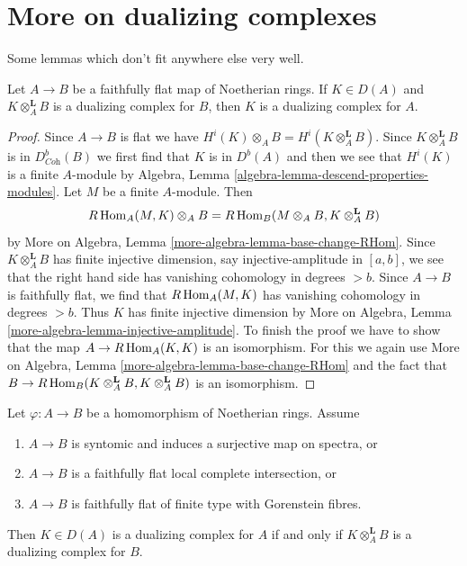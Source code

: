 \section{More on dualizing complexes}
\label{section-more-dualizing}

\noindent
Some lemmas which don't fit anywhere else very well.

\begin{lemma}
\label{lemma-descent}
Let $A \to B$ be a faithfully flat map of Noetherian rings.
If $K \in D(A)$ and $K \otimes_A^\mathbf{L} B$
is a dualizing complex for $B$, then $K$ is a dualizing complex
for $A$.
\end{lemma}

\begin{proof}
Since $A \to B$ is flat we have
$H^i(K) \otimes_A B = H^i(K \otimes_A^\mathbf{L} B)$.
Since $K \otimes_A^\mathbf{L} B$ is in $D^b_{\textit{Coh}}(B)$
we first find that $K$ is in $D^b(A)$ and then we see that
$H^i(K)$ is a finite $A$-module by
Algebra, Lemma \ref{algebra-lemma-descend-properties-modules}.
Let $M$ be a finite $A$-module. Then
$$
R\mathop{\mathrm{Hom}}\nolimits_A(M, K) \otimes_A B = R\mathop{\mathrm{Hom}}\nolimits_B(M \otimes_A B, K \otimes_A^\mathbf{L} B)
$$
by More on Algebra, Lemma \ref{more-algebra-lemma-base-change-RHom}.
Since $K \otimes_A^\mathbf{L} B$ has finite injective dimension,
say injective-amplitude in $[a, b]$, we see that the right hand side
has vanishing cohomology in degrees $> b$.
Since $A \to B$ is faithfully flat, we find
that $R\mathop{\mathrm{Hom}}\nolimits_A(M, K)$ has vanishing cohomology in degrees $> b$.
Thus $K$ has finite injective dimension by
More on Algebra, Lemma \ref{more-algebra-lemma-injective-amplitude}.
To finish the proof we have to show that the map
$A \to R\mathop{\mathrm{Hom}}\nolimits_A(K, K)$ is an isomorphism.
For this we again use
More on Algebra, Lemma \ref{more-algebra-lemma-base-change-RHom}
and the fact that
$B \to R\mathop{\mathrm{Hom}}\nolimits_B(K \otimes_A^\mathbf{L} B, K \otimes_A^\mathbf{L} B)$
is an isomorphism.
\end{proof}

\begin{lemma}
\label{lemma-descent-ascent}
Let $\varphi : A \to B$ be a homomorphism of Noetherian rings. Assume
\begin{enumerate}
\item $A \to B$ is syntomic and induces a surjective map on spectra, or
\item $A \to B$ is a faithfully flat local complete intersection, or
\item $A \to B$ is faithfully flat of finite type with Gorenstein fibres.
\end{enumerate}
Then $K \in D(A)$ is a dualizing complex for $A$ if and only if
$K \otimes_A^\mathbf{L} B$ is a dualizing complex for $B$.
\end{lemma}

